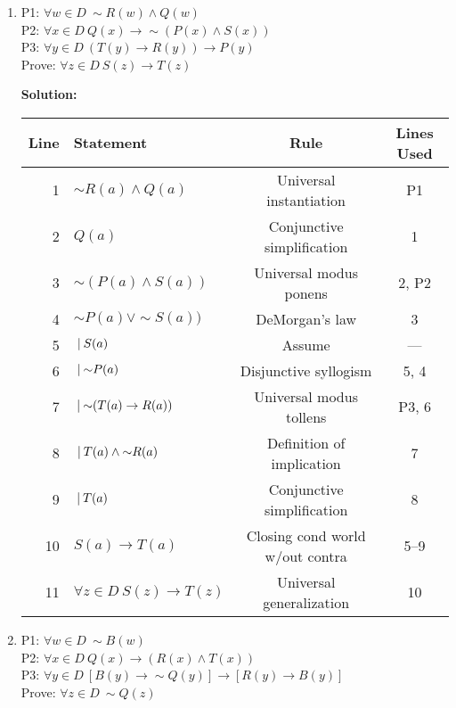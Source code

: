\documentclass[12pt, letterpaper]{report}
\newcommand{\nott}{{\sim}}
\begin{document}
\begin{enumerate}
\begin{enumerate}
\begin{tabular}{|r|l|c|c|}
                                \end{tabular}
        
\item P1: $\forall w \in D \ \nott R(w) \land Q(w)$ \\
        P2: $\forall x \in D \ Q(x) \to \nott (P(x) \land S(x))$ \\
        P3: $\forall y \in D \ (T(y) \to R(y)) \to P(y)$ \\
        Prove: $\forall z \in D \ S(z) \to T(z)$
        
        
  \textbf{Solution:}
        
        \begin{tabular}{|r|l|c|c|} \hline
                Line & Statement & Rule & Lines Used \\ \hline
                1 & $\nott R(a) \land Q(a)$ & Universal instantiation & P1 \\ \hline
                2 & $Q(a)$ & Conjunctive simplification & 1 \\ \hline
                3 & $\nott (P(a) \land S(a))$ & Universal modus ponens & 2, P2 \\ \hline
                4 & $\nott P(a) \lor \nott S(a))$ & DeMorgan's law & 3 \\ \hline
                5 & $\ \vline \ S(a)$ & Assume & --- \\ \hline
                6 & $\ \vline \ \nott P(a)$ & Disjunctive syllogism & 5, 4 \\ \hline
                7 & $\ \vline \ \nott (T(a) \to R(a))$& Universal modus tollens & P3, 6 \\ \hline
                8 & $\ \vline \ T(a) \land \nott R(a)$ & Definition of implication & 7 \\ \hline
                9 & $\ \vline \ T(a)$ & Conjunctive simplification & 8 \\ \hline
                10& $S(a) \to T(a)$ & Closing cond world w/out contra & 5--9 \\ \hline
                11& $\forall z \in D \ S(z) \to T(z)$ & Universal generalization & 10 \\ \hline

                \end{tabular}
        
\item P1: $\forall w \in D \ \nott B(w)$ \\
        P2: $\forall x \in D \ Q(x) \to (R(x) \land T(x))$ \\
        P3: $\forall y \in D \ [B(y) \to \nott Q(y)] \to [R(y) \to B(y)]$ \\
        Prove: $\forall z \in D \ \nott Q(z)$
        

\end{enumerate}
\end{enumerate}
\end{document}
